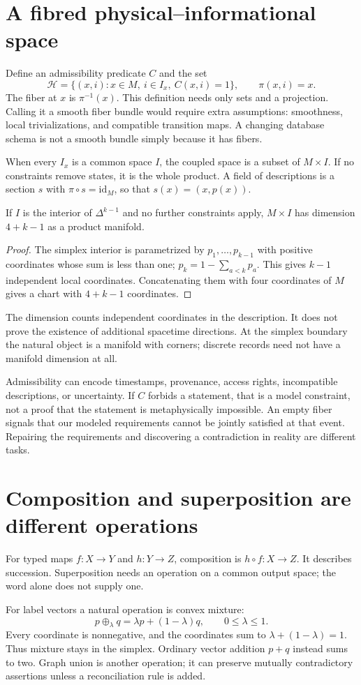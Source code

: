 \documentclass[12pt]{article}
\newcommand{\page}[1]{\section{#1}}
\begin{document}
\page{A fibred physical--informational space}
Define an admissibility predicate $C$ and the set
\begin{equation}\mathcal H=\{(x,i):x\in M,\ i\in I_x,\ C(x,i)=1\},\qquad \pi(x,i)=x.\end{equation}
The fiber at $x$ is $\pi^{-1}(x)$. This definition needs only sets and a projection. Calling it a smooth fiber bundle would require extra assumptions: smoothness, local trivializations, and compatible transition maps. A changing database schema is not a smooth bundle simply because it has fibers.

When every $I_x$ is a common space $I$, the coupled space is a subset of $M\times I$. If no constraints remove states, it is the whole product. A field of descriptions is a section $s$ with $\pi\circ s=\mathrm{id}_M$, so that $s(x)=(x,p(x))$.
\begin{proposition}
If $I$ is the interior of $\Delta^{k-1}$ and no further constraints apply, $M\times I$ has dimension $4+k-1$ as a product manifold.
\end{proposition}
\begin{proof}
The simplex interior is parametrized by $p_1,\ldots,p_{k-1}$ with positive coordinates whose sum is less than one; $p_k=1-\sum_{a<k}p_a$. This gives $k-1$ independent local coordinates. Concatenating them with four coordinates of $M$ gives a chart with $4+k-1$ coordinates.
\end{proof}
The dimension counts independent coordinates in the description. It does not prove the existence of additional spacetime directions. At the simplex boundary the natural object is a manifold with corners; discrete records need not have a manifold dimension at all.

Admissibility can encode timestamps, provenance, access rights, incompatible descriptions, or uncertainty. If $C$ forbids a statement, that is a model constraint, not a proof that the statement is metaphysically impossible. An empty fiber signals that our modeled requirements cannot be jointly satisfied at that event. Repairing the requirements and discovering a contradiction in reality are different tasks.

\page{Composition and superposition are different operations}
For typed maps $f:X\to Y$ and $h:Y\to Z$, composition is $h\circ f:X\to Z$. It describes succession. Superposition needs an operation on a common output space; the word alone does not supply one.

For label vectors a natural operation is convex mixture:
\begin{equation}p\oplus_\lambda q=\lambda p+(1-\lambda)q,\qquad0\leq\lambda\leq1.\end{equation}
Every coordinate is nonnegative, and the coordinates sum to $\lambda+(1-\lambda)=1$. Thus mixture stays in the simplex. Ordinary vector addition $p+q$ instead sums to two. Graph union is another operation; it can preserve mutually contradictory assertions unless a reconciliation rule is added.
\end{document}
